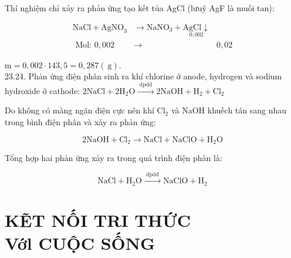\documentclass[10pt]{article}
\begin{document}
Thí nghiệm chỉ xảy ra phản ứng tạo kết tủa AgCl (lưuý AgF là muối tan):

$$
\begin{array}{rlr}
\mathrm{NaCl}+\mathrm{AgNO}_{3} & \longrightarrow \mathrm{NaNO}_{3}+\underset{0,002}{\mathrm{AgCl} \downarrow} \\
\text { Mol: } 0,002 & \rightarrow & 0,02
\end{array}
$$

$\mathrm{m}=0,002 \cdot 143,5=0,287(\mathrm{~g})$.\\
23.24. Phản ứng điện phân sinh ra khí chlorine ở anode, hydrogen và sodium hydroxide ở cathode: $2 \mathrm{NaCl}+2 \mathrm{H}_{2} \mathrm{O} \xrightarrow{\text { dpdd }} 2 \mathrm{NaOH}+\mathrm{H}_{2}+\mathrm{Cl}_{2}$

Do không có màng ngăn điện cực nên khí $\mathrm{Cl}_{2}$ và NaOH khuếch tán sang nhau trong bình điện phân và xảy ra phản ứng:

$$
2 \mathrm{NaOH}+\mathrm{Cl}_{2} \longrightarrow \mathrm{NaCl}+\mathrm{NaClO}+\mathrm{H}_{2} \mathrm{O}
$$

Tổng hợp hai phản ứng xảy ra trong quá trình điện phân là:

$$
\mathrm{NaCl}+\mathrm{H}_{2} \mathrm{O} \xrightarrow{\text { dpdd }} \mathrm{NaClO}+\mathrm{H}_{2}
$$

\section*{KẼT NỐI TRI THỨC \\
 Vớl CUỘC SỐNG}
\end{document}
